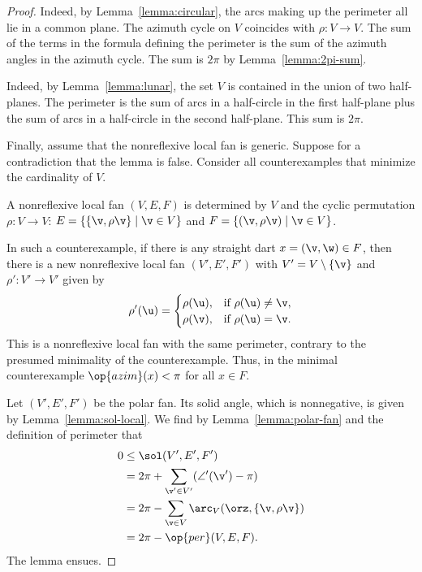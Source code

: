 \begin{proof} 
  Indeed, by Lemma~\ref{lemma:circular},
the arcs making up the perimeter all lie in a common plane.  The
azimuth cycle on $V$ coincides with $\rho:V\to V$.  The sum of the
terms in the formula defining the perimeter is the sum of the
azimuth angles in the azimuth cycle.  The sum is $2\pi$ by
Lemma~\ref{lemma:2pi-sum}.


  Indeed, by Lemma~\ref{lemma:lunar}, the
set $V$ is contained in the union of two half-planes.  The perimeter
is the sum of arcs in a half-circle in the first half-plane plus the
sum of arcs in a half-circle in the second half-plane. This sum is
$2\pi$.

Finally, assume that the nonreflexive local fan is generic.  Suppose for a
contradiction that the lemma is false.  Consider all counterexamples
that minimize the cardinality of $V$.  

A nonreflexive local fan $(V,E,F)$ is determined by $V$ and the cyclic
permutation $\rho:V\to V$: $E=\{\{\v,\rho \v\}\mid \v\in V\}$ and $F
= \{(\v,\rho \v)\mid \v\in V\}$.

In such a counterexample, if there is any straight dart $x=(\v,\w)\in F$,
then there is a new nonreflexive local fan $(V',E',F')$ with $V' =
V\setminus\{\v\}$ and $\rho':V'\to V'$ given by
\[ 
\rho'(\u) = \begin{cases}
\rho(\u), & \text{if } \rho(\u)\ne \v,\\
\rho(\v), & \text{if }\rho(\u) = \v.\\
\end{cases}
\] 
This is a nonreflexive local fan with the same perimeter, contrary to the presumed
minimality of the counterexample.  Thus, in the minimal counterexample
$\op{azim}(x) <\pi$ for all $x\in F$.

Let $(V',E',F')$ be the polar fan.  Its solid angle, which is nonnegative, is given by
Lemma~\ref{lemma:sol-local}.  We find by Lemma~\ref{lemma:polar-fan}
and the definition of perimeter that
\begin{align*}
0 &\le \sol(V',E',F') \\
    &= 2\pi + \sum_{\v'\in V'} (\angle'(\v') - \pi)\\
    &= 2\pi - \sum_{\v\in V} \arc_V(\orz,\{\v,\rho\v\})\\
    &= 2\pi - \op{per}(V,E,F).
\end{align*}
The lemma ensues.
\end{proof}



